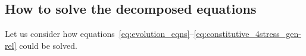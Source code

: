 \documentclass[\ifafour a4paper,12pt,\else a5paper,10pt,\fi%
onecolumn,oneside,article,%
british%
]{memoir}
\theoremstyle{remark}
\theoremstyle{innote}
\newcommand*{\mathte}[1]{\textbf{\textit{\textsf{#1}}}}
\newcommand*{\incr}{\triangle}%
\renewcommand*{\|}[1][]{\nonscript\,#1\vert\nonscript\;\mathopen{}}
\newcommand*{\yd}{N}
\newcommand*{\yTT}{\tau}
\newcommand*{\yT}{\bm{\yTT}}
\newcommand*{\ygg}{g}
\newcommand*{\yg}{\mathte{\ygg}}
\newcommand*{\yKK}{K}
\newcommand*{\yK}{\mathte{\yKK}}
\newcommand*{\ypp}{p}
\newcommand*{\yp}{\bm{\ypp}}
\newcommand*{\ye}{\epsilon}
\begin{document}
\subsection{How to solve the decomposed equations}
\label{sec:how_to_solve_3-1}

Let us consider how
equations~\eqref{eq:evolution_eqns}--\eqref{eq:constitutive_4stress_gen-rel}
could be solved.


\end{document}
